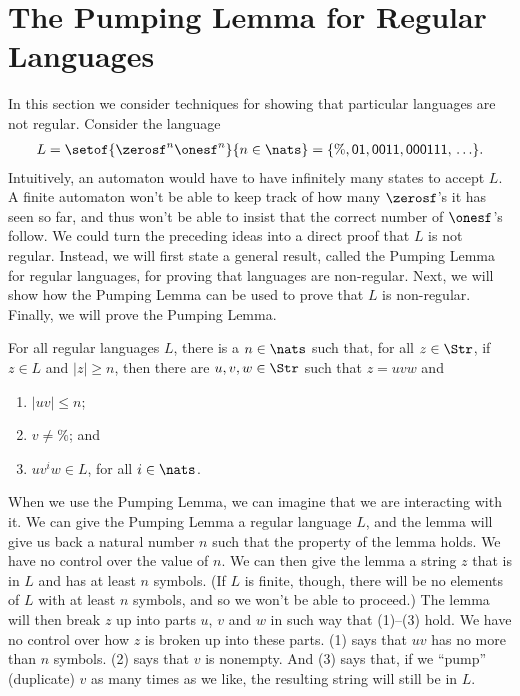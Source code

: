 \section{The Pumping Lemma for Regular Languages}
\label{ThePumpingLemmaForRegularLanguages}

%
%
%
In this section we consider techniques for showing that
particular languages are not regular.
Consider the language
\begin{gather*}
L=\setof{\zerosf^n\onesf^n}{n\in\nats} =
\mathsf{\{\%, 01, 0011, 000111,\,\ldots\}} .
\end{gather*}
Intuitively, an automaton would have to have infinitely many states to
accept $L$.  A finite automaton won't be able to keep track of how
many $\zerosf$'s it has seen so far, and thus won't be able to insist
that the correct number of $\onesf$'s follow.  We could turn the
preceding ideas into a direct proof that $L$ is not regular.  Instead,
we will first state a general result, called the Pumping Lemma for
regular languages, for proving that languages are non-regular.  Next,
we will show how the Pumping Lemma can be used to prove that $L$ is
non-regular.  Finally, we will prove the Pumping Lemma.

\begin{lemma}
For all regular languages $L$, there is a $n\in\nats$ such that,
for all $z\in\Str$, if $z\in L$ and $|z|\geq n$, then
there are $u,v,w\in\Str$ such that $z=uvw$ and
\begin{enumerate}[\quad(1)]
\item $|uv|\leq n$;

\item $v\neq\%$; and

\item $uv^iw\in L$, for all $i\in\nats$.
\end{enumerate}
\end{lemma}

When we use the Pumping Lemma, we can imagine that we are interacting
with it.  We can give the Pumping Lemma a regular language $L$, and
the lemma will give us back a natural number $n$ such that the
property of the lemma holds.  We have no control over the value of
$n$.  We can then give the lemma a string $z$ that is in $L$ and has
at least $n$ symbols.  (If $L$ is finite, though, there will be no
elements of $L$ with at least $n$ symbols, and so we won't be able to
proceed.)  The lemma will then break $z$ up into parts $u$, $v$ and
$w$ in such way that (1)--(3) hold.  We have no control over how $z$
is broken up into these parts.  (1) says that $uv$ has no more than
$n$ symbols.  (2) says that $v$ is nonempty.  And (3) says that, if we
``pump'' (duplicate) $v$ as many times as we like, the resulting
string will still be in $L$.

